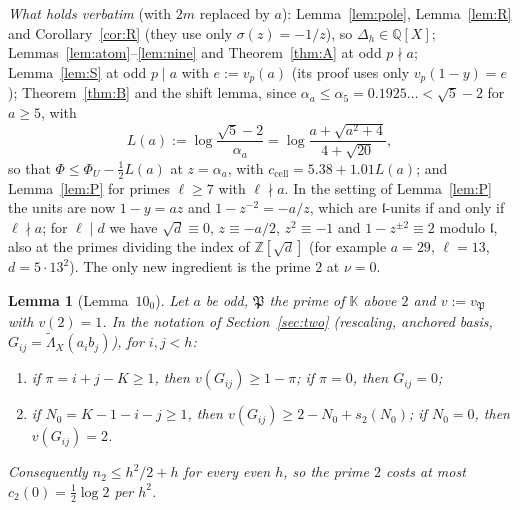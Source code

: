\documentclass[11pt]{amsart}
\newtheorem{lemma}[theorem]{Lemma}
\theoremstyle{definition}
\theoremstyle{remark}
\numberwithin{equation}{section}
\newcommand{\ZZ}{\mathbb{Z}}
\newcommand{\QQ}{\mathbb{Q}}
\newcommand{\KK}{\mathbb{K}}
\newcommand{\fl}{\mathfrak{l}}
\newcommand{\fP}{\mathfrak{P}}
\newcommand{\ccell}{c_{\mathrm{cell}}}
\begin{document}
\emph{What holds verbatim} (with $2m$ replaced by $a$): Lemma~\ref{lem:pole}, Lemma~\ref{lem:R} and
Corollary~\ref{cor:R} (they use only $\sigma(z)=-1/z$), so $\Delta_h\in\QQ[X]$; Lemmas~\ref{lem:atom}--\ref{lem:nine}
and Theorem~\ref{thm:A} at odd $p\nmid a$; Lemma~\ref{lem:S} at odd $p\mid a$ with $e:=v_p(a)$ (its proof uses only
$v_p(1-y)=e$); Theorem~\ref{thm:B} and the shift lemma, since $\alpha_a\le\alpha_5=0.1925\ldots<\sqrt5-2$ for $a\ge5$,
with
\[
  L(a):=\log\frac{\sqrt5-2}{\alpha_a}=\log\frac{a+\sqrt{a^2+4}}{4+\sqrt{20}},
\]
so that $\Phi\le\Phi_U-\frac12L(a)$ at $z=\alpha_a$, with $\ccell=5.38+1.01L(a)$; and Lemma~\ref{lem:P} for primes
$\ell\ge7$ with $\ell\nmid a$. In the setting of Lemma~\ref{lem:P} the units are now $1-y=az$ and $1-z^{-2}=-a/z$, which
are $\fl$-units if and only if $\ell\nmid a$; for $\ell\mid d$ we have $\sqrt d\equiv0$, $z\equiv-a/2$, $z^2\equiv-1$
and $1-z^{\pm2}\equiv2$ modulo $\fl$, also at the primes dividing the index of $\ZZ[\sqrt d]$ (for example $a=29$,
$\ell=13$, $d=5\cdot13^2$). The only new ingredient is the prime $2$ at $\nu=0$.

\begin{lemma}[Lemma~$10_0$]\label{lem:tenzero}
Let $a$ be odd, $\fP$ the prime of $\KK$ above $2$ and $v:=v_\fP$ with $v(2)=1$. In the notation of
Section~\ref{sec:two} (rescaling, anchored basis, $G_{ij}=\tilde\Lambda_X(a_ib_j)$), for $i,j<h$:
\begin{enumerate}
\item[(L)] if $\pi=i+j-K\ge1$, then $v(G_{ij})\ge1-\pi$; if $\pi=0$, then $G_{ij}=0$;
\item[(U)] if $N_0=K-1-i-j\ge1$, then $v(G_{ij})\ge2-N_0+s_2(N_0)$; if $N_0=0$, then $v(G_{ij})=2$.
\end{enumerate}
Consequently $n_2\le h^2/2+h$ for every even $h$, so the prime $2$ costs at most $c_2(0)=\frac12\log2$ per $h^2$.
\end{lemma}
\end{document}
